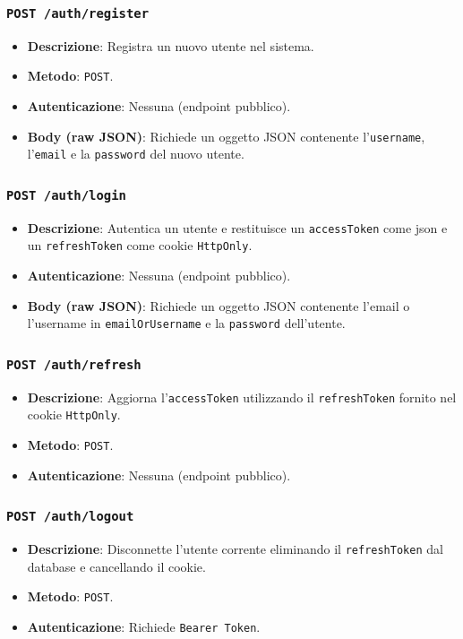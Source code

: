 \documentclass[11pt]{article}
\begin{document}
\subsubsection{\texttt{POST /auth/register}}
\begin{itemize}
    \item \textbf{Descrizione}: Registra un nuovo utente nel sistema.
    \item \textbf{Metodo}: \texttt{POST}.
    \item \textbf{Autenticazione}: Nessuna (endpoint pubblico).
    \item \textbf{Body (raw JSON)}: Richiede un oggetto JSON contenente l'\texttt{username}, l'\texttt{email} e la \texttt{password} del nuovo utente.
\end{itemize}

\subsubsection{\texttt{POST /auth/login}}
\begin{itemize}
    \item \textbf{Descrizione}: Autentica un utente e restituisce un \texttt{accessToken} come json e un \texttt{refreshToken} come cookie \texttt{HttpOnly}.
    \item \textbf{Autenticazione}: Nessuna (endpoint pubblico).
    \item \textbf{Body (raw JSON)}: Richiede un oggetto JSON contenente l'email o l'username in \texttt{emailOrUsername} e la \texttt{password} dell'utente.
\end{itemize}

\subsubsection{\texttt{POST /auth/refresh}}
\begin{itemize}
    \item \textbf{Descrizione}: Aggiorna l'\texttt{accessToken} utilizzando il \texttt{refreshToken} fornito nel cookie \texttt{HttpOnly}.
    \item \textbf{Metodo}: \texttt{POST}.
    \item \textbf{Autenticazione}: Nessuna (endpoint pubblico).
\end{itemize}

\subsubsection{\texttt{POST /auth/logout}}
\begin{itemize}
    \item \textbf{Descrizione}: Disconnette l'utente corrente eliminando il \texttt{refreshToken} dal database e cancellando il cookie.
    \item \textbf{Metodo}: \texttt{POST}.
    \item \textbf{Autenticazione}: Richiede \texttt{Bearer Token}.
\end{itemize}
\end{document}
